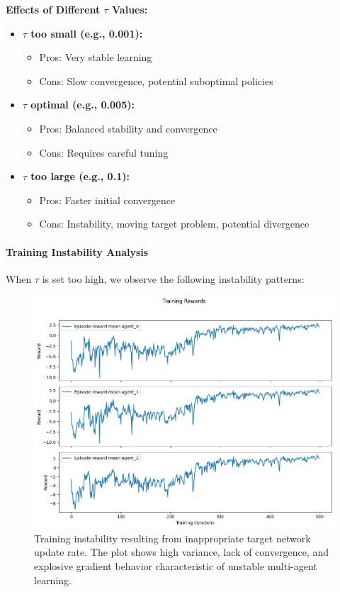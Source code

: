 \documentclass[conference]{IEEEtran}
\begin{document}
{{\textbf{Effects of Different $\tau$ Values:}

\begin{itemize}
    \item \textbf{$\tau$ too small (e.g., 0.001):} 
    \begin{itemize}
        \item Pros: Very stable learning
        \item Cons: Slow convergence, potential suboptimal policies
    \end{itemize}
    
    \item \textbf{$\tau$ optimal (e.g., 0.005):}
    \begin{itemize}
        \item Pros: Balanced stability and convergence
        \item Cons: Requires careful tuning
    \end{itemize}
    
    \item \textbf{$\tau$ too large (e.g., 0.1):}
    \begin{itemize}
        \item Pros: Faster initial convergence
        \item Cons: Instability, moving target problem, potential divergence
    \end{itemize}
\end{itemize}

\paragraph{Training Instability Analysis}

When $\tau$ is set too high, we observe the following instability patterns:

\begin{figure}[h!]
    \centering
    \includegraphics[width=0.75\linewidth]{figs/results.jpg}
    \caption{Training instability resulting from inappropriate target network update rate. The plot shows high variance, lack of convergence, and explosive gradient behavior characteristic of unstable multi-agent learning.}
    \label{fig:unstable_learning}
\end{figure}

}}
\end{document}
